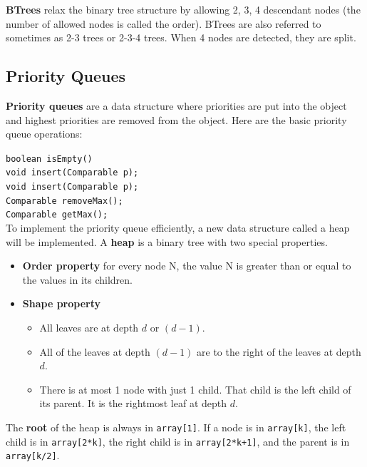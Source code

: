 \textbf{BTrees} relax the binary tree structure by allowing 2, 3, 4 descendant nodes (the number of allowed nodes is called the order). BTrees are also referred to sometimes as 2-3 trees or 2-3-4 trees. When 4 nodes are detected, they are split. 

\subsection{Priority Queues}

\textbf{Priority queues} are a data structure where priorities are put into the object and highest priorities are removed from the object. Here are the basic priority queue operations:

\indent \indent \texttt{boolean isEmpty()} \\
\indent \indent \texttt{void insert(Comparable p);} \\
\indent \indent \texttt{void insert(Comparable p);} \\
\indent \indent \texttt{Comparable removeMax();} \\
\indent \indent \texttt{Comparable getMax();} \\

To implement the priority queue efficiently, a new data structure called a heap will be implemented. A \textbf{heap} is a binary tree with two special properties.

\begin{itemize}
	\item \textbf{Order property} for every node N, the value N is greater than or equal to the values in its children. 
	\item \textbf{Shape property} 
	\begin{itemize}
		\item All leaves are at depth $d$ or $(d-1)$.
		\item All of the leaves at depth $(d-1)$ are to the right of the leaves at depth $d$.
		\item There is at most 1 node with just 1 child. That child is the left child of its parent. It is the rightmost leaf at depth $d$. 
	\end{itemize}
\end{itemize}

The \textbf{root} of the heap is always in \texttt{array[1]}. If a node is in \texttt{array[k]}, the left child is in \texttt{array[2*k]}, the right child is in \texttt{array[2*k+1]}, and the parent is in \texttt{array[k/2]}.

